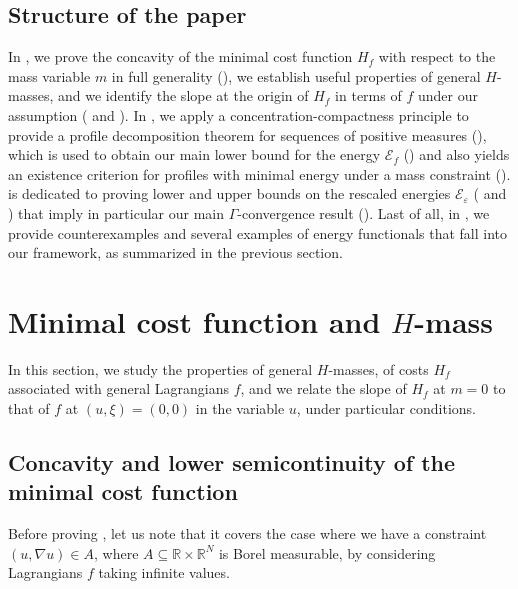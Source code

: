 \documentclass[JEP,XML,SOM,Unicode,published]{cedram}
\theoremstyle{plain}
\theoremstyle{definition}
\newcommand{\R}{\mathbb{R}}
\newcommand{\ener}{\mathcal{E}}
\newcommand{\eps}{\varepsilon}
\begin{document}
\subsection{Structure of the paper} In , we prove the concavity of the minimal cost function \(H_f\) with respect to the mass variable \(m\) in full generality (), we establish useful properties of general \(H\)-masses, and we identify the slope at the origin of \(H_f\) in terms of \(f\) under our assumption ( and ). In , we apply a concentration-compactness principle to provide a profile decomposition theorem for sequences of positive measures (), which is used to obtain our main lower bound for the energy \(\ener_f\) () and also yields an existence criterion for profiles with minimal energy under a mass constraint ().  is dedicated to proving lower and upper bounds on the rescaled energies \(\ener_\eps\) ( and ) that imply in particular our main \(\Gamma\)-convergence result (). Last of all, in , we provide counterexamples and several examples of energy functionals that fall into our framework, as summarized in the previous section.

\section{Minimal cost function and \texorpdfstring{\(H\)-mass}{H-mass}}\label{sectionMinimalCost}

In this section, we study the properties of general $H$-masses, of costs $H_f$ associated with general Lagrangians $f$, and we relate the slope of $H_f$ at $m=0$ to that of $f$ at $(u,\xi) = (0,0)$ in the variable $u$, under particular conditions.

\subsection{Concavity and lower semicontinuity of the minimal cost function}

Before proving , let us note that it covers the case where we have a constraint \((u,\nabla u)\in A\), where \(A\subseteq\R\times \R^N\) is Borel measurable, by considering Lagrangians \(f\) taking infinite values.
\end{document}
